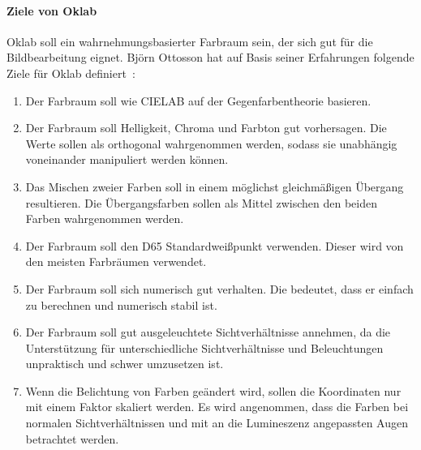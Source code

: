 \documentclass[12pt, a4paper, ngerman]{article}
\begin{document}
\paragraph{Ziele von Oklab}
Oklab soll ein wahrnehmungsbasierter Farbraum sein, der sich gut für die Bildbearbeitung eignet.
Björn Ottosson hat auf Basis seiner Erfahrungen folgende Ziele für Oklab definiert~\cite{Oklab_2020}:
\begin{enumerate}
  \item Der Farbraum soll wie CIELAB auf der Gegenfarbentheorie basieren.
  \item Der Farbraum soll Helligkeit, Chroma und Farbton gut vorhersagen. Die Werte sollen als orthogonal wahrgenommen werden, sodass sie unabhängig voneinander manipuliert werden können.
  \item Das Mischen zweier Farben soll in einem möglichst gleichmäßigen Übergang resultieren. Die Übergangsfarben sollen als Mittel zwischen den beiden Farben wahrgenommen werden. 
  \item Der Farbraum soll den D65 Standardweißpunkt verwenden. Dieser wird von den meisten Farbräumen verwendet.
  \item Der Farbraum soll sich numerisch gut verhalten. Die bedeutet, dass er einfach zu berechnen und numerisch stabil ist.
  \item Der Farbraum soll gut ausgeleuchtete Sichtverhältnisse annehmen, da die Unterstützung für unterschiedliche Sichtverhältnisse und Beleuchtungen unpraktisch und schwer umzusetzen ist.
  \item Wenn die Belichtung von Farben geändert wird, sollen die Koordinaten nur mit einem Faktor skaliert werden. Es wird angenommen, dass die Farben bei normalen Sichtverhältnissen und mit an die Lumineszenz angepassten Augen betrachtet werden.
\end{enumerate}
\end{document}
